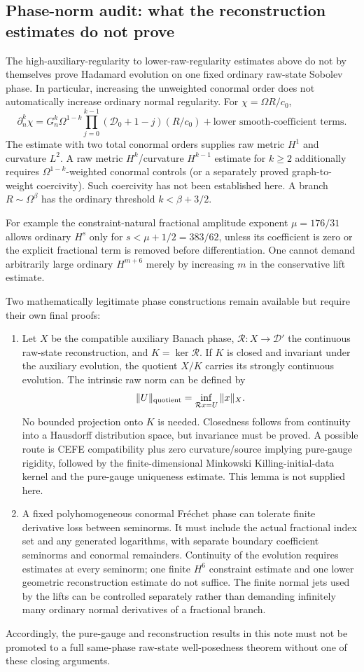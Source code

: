 \subsection{Phase-norm audit: what the reconstruction estimates do not prove}
The high-auxiliary-regularity to lower-raw-regularity estimates above do not by themselves prove Hadamard evolution on one fixed ordinary raw-state Sobolev phase. In particular, increasing the unweighted conormal order does not automatically increase ordinary normal regularity. For $\chi=\Omega R/c_0$,
\[
 \partial_n^k\chi
 =G_n^k\Omega^{1-k}
 \prod_{j=0}^{k-1}(\mathcal D_0+1-j)(R/c_0)
 +\text{lower smooth-coefficient terms}.
\]
The estimate with two total conormal orders supplies raw metric $H^1$ and curvature $L^2$. A raw metric $H^k$/curvature $H^{k-1}$ estimate for $k\ge2$ additionally requires $\Omega^{1-k}$-weighted conormal controls (or a separately proved graph-to-weight coercivity). Such coercivity has not been established here. A branch $R\sim\Omega^\beta$ has the ordinary threshold $k<\beta+3/2$.

For example the constraint-natural fractional amplitude exponent $\mu=176/31$ allows ordinary $H^s$ only for $s<\mu+1/2=383/62$, unless its coefficient is zero or the explicit fractional term is removed before differentiation. One cannot demand arbitrarily large ordinary $H^{m+6}$ merely by increasing $m$ in the conservative lift estimate.

Two mathematically legitimate phase constructions remain available but require their own final proofs:
\begin{enumerate}
\item Let $X$ be the compatible auxiliary Banach phase, $\mathcal R:X\to\mathcal D'$ the continuous raw-state reconstruction, and $K=\ker\mathcal R$. If $K$ is closed and invariant under the auxiliary evolution, the quotient $X/K$ carries its strongly continuous evolution. The intrinsic raw norm can be defined by
\[
 \|U\|_{\rm quotient}=\inf_{\mathcal R x=U}\|x\|_X.
\]
No bounded projection onto $K$ is needed. Closedness follows from continuity into a Hausdorff distribution space, but invariance must be proved. A possible route is CEFE compatibility plus zero curvature/source implying pure-gauge rigidity, followed by the finite-dimensional Minkowski Killing-initial-data kernel and the pure-gauge uniqueness estimate. This lemma is not supplied here.
\item A fixed polyhomogeneous conormal Fr\'echet phase can tolerate finite derivative loss between seminorms. It must include the actual fractional index set and any generated logarithms, with separate boundary coefficient seminorms and conormal remainders. Continuity of the evolution requires estimates at every seminorm; one finite $H^6$ constraint estimate and one lower geometric reconstruction estimate do not suffice. The finite normal jets used by the lifts can be controlled separately rather than demanding infinitely many ordinary normal derivatives of a fractional branch.
\end{enumerate}
Accordingly, the pure-gauge and reconstruction results in this note must not be promoted to a full same-phase raw-state well-posedness theorem without one of these closing arguments.
